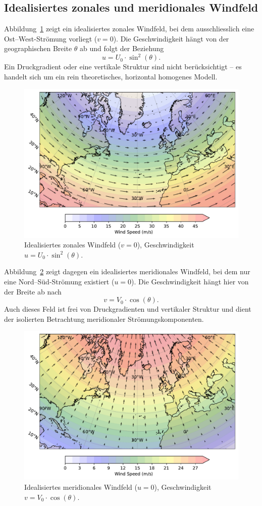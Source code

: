 
\subsection{Idealisiertes zonales und meridionales Windfeld}

Abbildung~\ref{fig:zonal_wind} zeigt ein idealisiertes zonales Windfeld, bei dem ausschliesslich eine Ost–West-Strömung vorliegt (\(v = 0\)).
Die Geschwindigkeit hängt von der geographischen Breite \(\theta\) ab und folgt der Beziehung
\[
	u = U_0 \cdot \sin^2(\theta).
\]
Ein Druckgradient oder eine vertikale Struktur sind nicht berücksichtigt – es handelt sich um ein rein theoretisches, horizontal homogenes Modell.

\begin{figure}
	\centering
	\includegraphics[width=0.6\linewidth]{papers/rossby/images/zonal_wind_plot.pdf}
	\caption{Idealisiertes zonales Windfeld (\(v=0\)), Geschwindigkeit \(u = U_0 \cdot \sin^2(\theta)\).}
	\label{fig:zonal_wind}
\end{figure}

\noindent
Abbildung~\ref{fig:meridional_wind} zeigt dagegen ein idealisiertes meridionales Windfeld, bei dem nur eine Nord–Süd-Strömung existiert (\(u = 0\)).
Die Geschwindigkeit hängt hier von der Breite ab nach
\[
	v = V_0 \cdot \cos(\theta).
\]
Auch dieses Feld ist frei von Druckgradienten und vertikaler Struktur und dient der isolierten Betrachtung meridionaler Strömungskomponenten.

\begin{figure}
	\centering
	\includegraphics[width=0.6\linewidth]{papers/rossby/images/meridional_wind_plot.pdf}
	\caption{Idealisiertes meridionales Windfeld (\(u=0\)), Geschwindigkeit \(v = V_0 \cdot \cos(\theta)\).}
	\label{fig:meridional_wind}
\end{figure}

